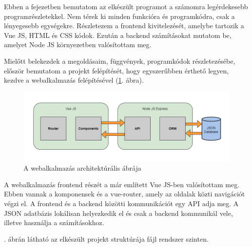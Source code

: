 
Ebben a fejezetben bemutatom az elkészült programot a számomra legérdekesebb programrészletekkel. Nem térek ki minden funkcióra és programkódra, csak a lényegesebb egységekre. Részletezem a frontend kivitelezését, amelybe tartozik a Vue JS, HTML és CSS kódok. Ezután a backend számításokat mutatom be, amelyet Node JS környezetben valósítottam meg.


Mielőtt belekezdek a megoldásaim, függvények, programkódok részletezésébe, először bemutatom a projekt felépítését, hogy egyszerűbben érthető legyen, kezdve a webalkalmazás felépítésével (\ref{fig:web-arch}. ábra). 

\begin{figure}[h]
	\centering
	\includegraphics[width=\textwidth]{images/web-arch.png}
	\caption{A webalkalmazás architektúrális ábrája}
	\label{fig:web-arch}
\end{figure}

A webalkalmazás frontend részét a már említett Vue JS-ben valósítottam meg. Ebben vannak a komponensek és a vue-router, amely az oldalak közti navigációt végzi el. A frontend és a backend közötti kommunikációt egy API adja meg. A JSON adatbázis lokálisan helyezkedik el és csak a backend kommunikál vele, illetve használja a számításokhoz.

. ábrán látható az elkészült projekt struktúrája fájl rendszer szinten.

